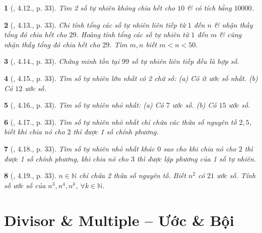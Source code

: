 \documentclass{article}
\newtheorem{baitoan}{}
\begin{document}
\begin{baitoan}[\cite{TLCT_THCS_Toan_6_so_hoc}, 4.12., p. 33]
	Tìm 2 số tự nhiên không chia hết cho $10$ \& có tích bằng $10000$.
\end{baitoan}

\begin{baitoan}[\cite{TLCT_THCS_Toan_6_so_hoc}, 4.13., p. 33]
	Chi tính tổng các số tự nhiên liên tiếp từ $1$ đến $n$ \& nhận thấy tổng đó chia hết cho $29$. Hoàng tính tổng các số tự nhiên từ $1$ đến $m$ \& cũng nhận thấy tổng đó chia hết cho $29$. Tìm $m,n$ biết $m < n < 50$.
\end{baitoan}

\begin{baitoan}[\cite{TLCT_THCS_Toan_6_so_hoc}, 4.14., p. 33]
	Chứng minh tồn tại $99$ số tự nhiên liên tiếp đều là hợp số.
\end{baitoan}

\begin{baitoan}[\cite{TLCT_THCS_Toan_6_so_hoc}, 4.15., p. 33]
	Tìm số tự nhiên lớn nhất có 2 chữ số: (a) Có ít ước số nhất. (b) Có $12$ ước số.
\end{baitoan}

\begin{baitoan}[\cite{TLCT_THCS_Toan_6_so_hoc}, 4.16., p. 33]
	Tìm số tự nhiên nhỏ nhất: (a) Có $7$ ước số. (b) Có $15$ ước số.
\end{baitoan}

\begin{baitoan}[\cite{TLCT_THCS_Toan_6_so_hoc}, 4.17., p. 33]
	Tìm số tự nhiên nhỏ nhất chỉ chứa các thừa số nguyên tố $2,5$, biết khi chia nó cho $2$ thì được 1 số chính phương.
\end{baitoan}

\begin{baitoan}[\cite{TLCT_THCS_Toan_6_so_hoc}, 4.18., p. 33]
	Tìm số tự nhiên nhỏ nhất khác $0$ sao cho khi chia nó cho $2$ thì được 1 số chính phương, khi chia nó cho $3$ thì được lập phương của 1 số tự nhiên.
\end{baitoan}

\begin{baitoan}[\cite{TLCT_THCS_Toan_6_so_hoc}, 4.19., p. 33]
	$n\in\mathbb{N}$ chỉ chứa 2 thừa số nguyên tố. Biết $n^2$ có $21$ ước số. Tính số ước số của $n^3,n^4,n^k$, $\forall k\in\mathbb{N}$.
\end{baitoan}


\section{Divisor \& Multiple -- Ước \& Bội}
\end{document}
